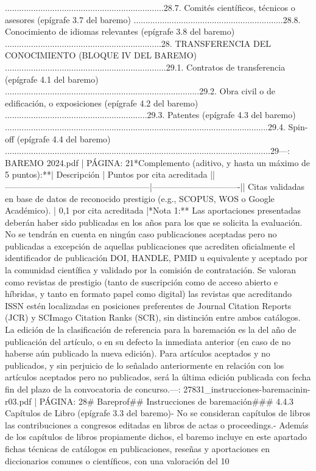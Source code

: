 \documentclass{article}
\begin{document}
\begin{itemize}
...................................................................28.7. Comités científicos, técnicos o asesores (epígrafe 3.7 del baremo) ...............................................................28.8. Conocimiento de idiomas relevantes (epígrafe 3.8 del baremo) ..................................................................28. TRANSFERENCIA DEL CONOCIMIENTO (BLOQUE IV DEL BAREMO) ....................................................................29.1. Contratos de transferencia (epígrafe 4.1 del baremo) ..................................................................................29.2. Obra civil o de edificación, o exposiciones (epígrafe 4.2 del baremo) ............................................................29.3. Patentes (epígrafe 4.3 del baremo) ...............................................................................................................29.4. Spin-off (epígrafe 4.4 del baremo) ................................................................................................................29\n\n---\n\nFUENTE: BAREMO 2024.pdf | PÁGINA: 21\n**Complemento (aditivo, y hasta un máximo de 5 puntos):**\n\n| Descripción                                         | Puntos por cita acreditada    |\n|---------------------------------------------------|-------------------------------|\n| Citas validadas en base de datos de reconocido prestigio (e.g., SCOPUS, WOS o Google Académico). | 0,1 por cita acreditada       |\n\n**Nota 1:** Las aportaciones presentadas deberán haber sido publicadas en los años para los que se solicita la evaluación. No se tendrán en cuenta en ningún caso publicaciones aceptadas pero no publicadas a excepción de aquellas publicaciones que acrediten oficialmente el identificador de publicación DOI, HANDLE, PMID u equivalente y aceptado por la comunidad científica y validado por la comisión de contratación. Se valoran como revistas de prestigio (tanto de suscripción como de acceso abierto e híbridas, y tanto en formato papel como digital) las revistas que acreditando ISSN estén localizadas en posiciones preferentes de Journal Citation Reports (JCR) y SCImago Citation Ranks (SCR), sin distinción entre ambos catálogos. La edición de la clasificación de referencia para la baremación es la del año de publicación del artículo, o en su defecto la inmediata anterior (en caso de no haberse aún publicado la nueva edición). Para artículos aceptados y no publicados, y sin perjuicio de lo señalado anteriormente en relación con los artículos aceptados pero no publicados, será la última edición publicada con fecha fin del plazo de la convocatoria de concurso.\n\n---\n\nFUENTE: 27831_instrucciones-baremacinin-r03.pdf | PÁGINA: 28\n# Bareprof\n\n## Instrucciones de baremación\n\n### 4.4.3 Capítulos de Libro (epígrafe 3.3 del baremo)\n\n- No se consideran capítulos de libros las contribuciones a congresos editadas en libros de actas o proceedings.\n- Además de los capítulos de libros propiamente dichos, el baremo incluye en este apartado fichas técnicas de catálogos en publicaciones, reseñas y aportaciones en diccionarios comunes o científicos, con una valoración del 10%
\end{itemize}
\end{document}
